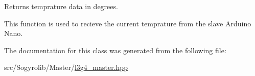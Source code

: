 Returns temprature data in degrees. 

This function is used to recieve the current temprature from the slave Arduino Nano. 

The documentation for this class was generated from the following file\+:\begin{DoxyCompactItemize}
\item 
src/\+Sogyrolib/\+Master/\hyperlink{l3g4__master_8hpp}{l3g4\+\_\+master.\+hpp}\end{DoxyCompactItemize}
